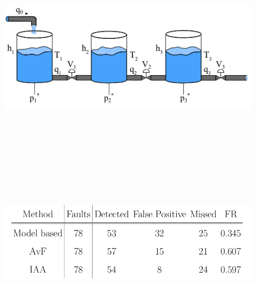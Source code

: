 \documentclass{tikzposter}
\begin{document}
{		\begin{minipage}[t]{0.40\textwidth}
			\centering
			\includegraphics[height=10cm]{./Images/3-tanks.pdf}
		\end{minipage}
		\begin{minipage}[t]{0.43\textwidth}
			\centering
			\includegraphics[height=9cm]{./Images/comparison_results.png}
		\end{minipage}
	}
\end{document}
